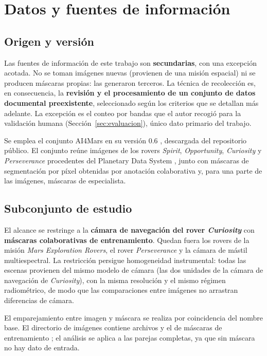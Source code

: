 \section{Datos y fuentes de información}
\label{sec:datos}

\subsection{Origen y versión}

Las fuentes de información de este trabajo son \textbf{secundarias}, con una excepción
acotada. No se toman imágenes nuevas (provienen de una misión espacial) ni se producen
máscaras propias: las generaron terceros. La técnica de recolección es, en consecuencia, la
\textbf{revisión y el procesamiento de un conjunto de datos documental preexistente},
seleccionado según los criterios que se detallan más adelante. La excepción es el conteo por
bandas que el autor recogió para la validación humana (Sección~\ref{sec:evaluacion}), único
dato primario del trabajo.

Se emplea el conjunto AI4Mars en su versión 0.6 \citep{swan2022ai4marsdata}, descargada
del repositorio público. El conjunto reúne imágenes de los rovers \textit{Spirit},
\textit{Opportunity}, \textit{Curiosity} y \textit{Perseverance} procedentes del Planetary
Data System \citep{nasapds2024}, junto con máscaras de segmentación por píxel obtenidas por
anotación colaborativa y, para una parte de las imágenes, máscaras de especialista.

\subsection{Subconjunto de estudio}

El alcance se restringe a la \textbf{cámara de navegación del rover \textit{Curiosity}}
con \textbf{máscaras colaborativas de entrenamiento}. Quedan fuera los rovers de la misión
\textit{Mars Exploration Rovers}, el rover \textit{Perseverance} y la cámara de mástil
multiespectral. La restricción persigue homogeneidad instrumental: todas las escenas
provienen del mismo modelo de cámara (las dos unidades de la cámara de navegación de
\textit{Curiosity}), con la misma resolución y el mismo régimen radiométrico, de modo que las
comparaciones entre imágenes no arrastran diferencias de cámara.

El emparejamiento entre imagen y máscara se realiza por coincidencia del nombre base. El
directorio de imágenes contiene \cNImagenes{} archivos y el de máscaras de entrenamiento
\cNEscenas{}; el análisis se aplica a las \cNEscenas{} parejas completas, ya que sin máscara
no hay dato de entrada.

